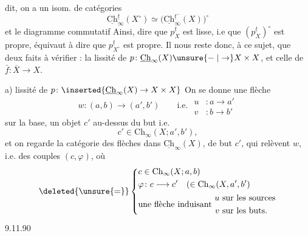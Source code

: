 dit, on a un isom. de catégories
\[
\boxed{\underline{\mathrm{Ch}}_{\infty}^{\underline t}(X^{\circ})
\simeq\bigl(\underline{\mathrm{Ch}}_{\infty}^{\underline t^{-}}(X)\bigr)^{\circ}}
\]
et  le diagramme commutatif
Ainsi, dire que $p^{\underline t}_X$ est lisse, i.e que
$(p^{\underline t}_X)^{\circ}$ est propre, équivaut à dire que $p^{\underline t}_{X^{\circ}}$ est
propre.
Il nous reste donc, à ce sujet, que deux faits à
vérifier : la lissité de $p\colon\underline{\mathrm{Ch}}_{\infty}(X)\unsure{\relbar|\to}X\times X$,
et celle de $\bar f\colon\overline X\longrightarrow X$.

a) lissité de $p\colon\inserted{\underline{\mathrm{Ch}}_{\infty}(X)\to X\times X}$ On se donne une flèche
\[
w\colon(a,b)\longrightarrow(a',b')\qquad
\text{i.e. }\begin{aligned}u&\colon a\to a'\\v&\colon b\to b'\end{aligned}
\]
sur la base, un objet $c'$ au-dessus du but
i.e.
\[
c'\in\mathrm{Ch}_{\infty}(X;a',b'),
\]
et on regarde la catégorie des flèches dans
$\underline{\mathrm{Ch}}_{\infty}(X)$, de but $c'$, qui relèvent $w$,
i.e.  des couples \deleted{\unsure{$\varphi$}} $(c,\varphi)$, où
\[
\deleted{\unsure{=}}\left\{\begin{aligned}
&c\in\mathrm{Ch}_{\infty}(X;a,b)\\
&\varphi\colon c\longrightarrow c'\quad(\in\mathrm{Ch}_{\infty}(X,a',b')\\
&\text{une flèche induisant }\begin{aligned}u&\ \text{sur les sources}\\v&\ \text{sur les buts.}\end{aligned}
\end{aligned}\right.
\]
9.11.90

